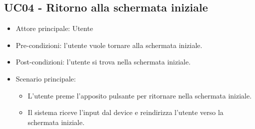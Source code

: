 \subsection{UC04 - Ritorno alla schermata iniziale}
\begin{itemize}
    \item Attore principale: Utente
    \item Pre-condizioni: l'utente vuole tornare alla schermata iniziale.
    \item Post-condizioni: l'utente si trova nella schermata iniziale.
    \item Scenario principale: \begin{itemize}
        \item L'utente preme l'apposito pulsante per ritornare nella schermata iniziale.
        \item Il sistema riceve l'input dal device e reindirizza l'utente verso la schermata iniziale.
    \end{itemize}
\end{itemize}

\newpage
